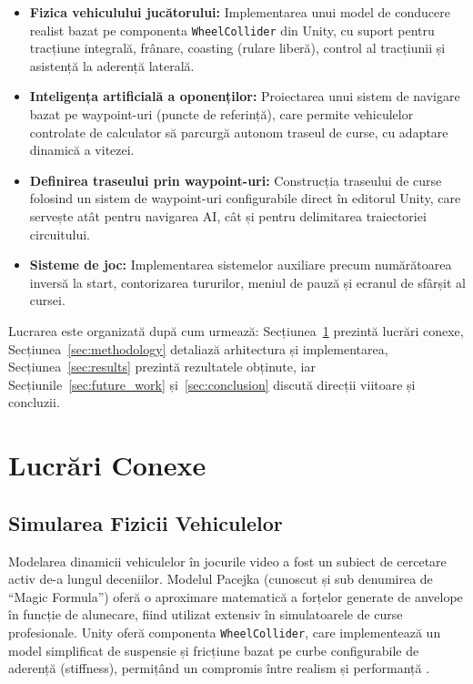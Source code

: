 \documentclass[11pt,twocolumn]{article}
\begin{document}
\begin{itemize}
    \item \textbf{Fizica vehiculului jucătorului:} Implementarea unui model de conducere realist bazat pe componenta \texttt{WheelCollider} din Unity, cu suport pentru tracțiune integrală, frânare, coasting (rulare liberă), control al tracțiunii și asistență la aderență laterală.

    \item \textbf{Inteligența artificială a oponenților:} Proiectarea unui sistem de navigare bazat pe waypoint-uri (puncte de referință), care permite vehiculelor controlate de calculator să parcurgă autonom traseul de curse, cu adaptare dinamică a vitezei.

    \item \textbf{Definirea traseului prin waypoint-uri:} Construcția traseului de curse folosind un sistem de waypoint-uri configurabile direct în editorul Unity, care servește atât pentru navigarea AI, cât și pentru delimitarea traiectoriei circuitului.

    \item \textbf{Sisteme de joc:} Implementarea sistemelor auxiliare precum numărătoarea inversă la start, contorizarea tururilor, meniul de pauză și ecranul de sfârșit al cursei.
\end{itemize}

Lucrarea este organizată după cum urmează: Secțiunea~\ref{sec:related_work} prezintă lucrări conexe, Secțiunea~\ref{sec:methodology} detaliază arhitectura și implementarea, Secțiunea~\ref{sec:results} prezintă rezultatele obținute, iar Secțiunile~\ref{sec:future_work} și~\ref{sec:conclusion} discută direcții viitoare și concluzii.

\section{Lucrări Conexe}
\label{sec:related_work}

\subsection{Simularea Fizicii Vehiculelor}

Modelarea dinamicii vehiculelor în jocurile video a fost un subiect de cercetare activ de-a lungul deceniilor. Modelul Pacejka (cunoscut și sub denumirea de ``Magic Formula'') \cite{pacejka2012tire} oferă o aproximare matematică a forțelor generate de anvelope în funcție de alunecare, fiind utilizat extensiv în simulatoarele de curse profesionale. Unity oferă componenta \texttt{WheelCollider}, care implementează un model simplificat de suspensie și fricțiune bazat pe curbe configurabile de aderență (stiffness), permițând un compromis între realism și performanță \cite{unity_manual_wheelcollider}.
\end{document}

